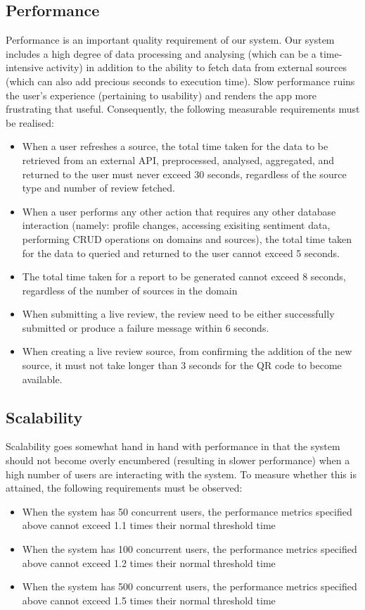 \documentclass[12pt]{article}
\begin{document}
\subsection{Performance}
Performance is an important quality requirement of our system. Our system includes a high degree of data processing and analysing (which can be a time-intensive activity) in addition to the ability to fetch data from external sources (which can also add precious seconds to execution time). Slow performance ruins the user's experience (pertaining to usability) and renders the app more frustrating that useful. Consequently, the following measurable requirements must be realised:
\begin{itemize}
    \item When a user refreshes a source, the total time taken for the data to be retrieved from an external API, preprocessed, analysed, aggregated, and returned to the user must never exceed 30 seconds, regardless of the source type and number of review fetched.
    \item When a user performs any other action that requires any other database interaction (namely: profile changes, accessing exisiting sentiment data, performing CRUD operations on domains and sources), the total time taken for the data to queried and returned to the user cannot exceed 5 seconds.
    \item The total time taken for a report to be generated cannot exceed 8 seconds, regardless of the number of sources in the domain
    \item When submitting a live review, the review need to be either successfully submitted or produce a failure message within 6 seconds.
    \item When creating a live review source, from confirming the addition of the new source, it must not take longer than 3 seconds for the QR code to become available.
\end{itemize}
\subsection{Scalability}
Scalability goes somewhat hand in hand with performance in that the system should not become overly encumbered (resulting in slower performance) when a high number of users are interacting with the system. To measure whether this is attained, the following requirements must be observed:
\begin{itemize}
    \item When the system has 50 concurrent users, the performance metrics specified above cannot exceed 1.1 times their normal threshold time
    \item When the system has 100 concurrent users, the performance metrics specified above cannot exceed 1.2 times their normal threshold time
    \item When the system has 500 concurrent users, the performance metrics specified above cannot exceed 1.5 times their normal threshold time
\end{itemize}
\end{document}

